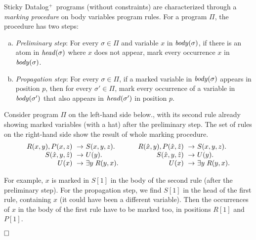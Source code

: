 \documentclass[format=acmsmall, review=false, screen=true]{acmart}
\newcommand{\ignore}[1]{}
\newcommand{\boxtheorem}{\ensuremath{\hfill \Box}}
\newcommand{\prg}{\Pi}
\newcommand{\dplus}{{Datalog}$^+$}
\begin{document}
Sticky \dplus \ programs (without constraints) are characterized through a  {\em marking procedure} on body variables program rules. For a program $\prg$, the procedure has two steps:
\begin{enumerate}[(a)]
  \item {\em Preliminary step}: For every $\sigma \in \prg$ and variable $x$ in ${\it body}(\sigma)$, if there is an atom in ${\it head}(\sigma)$ where $x$ does not appear, mark  every occurrence $x$ in  ${\it body}(\sigma)$.
  \item {\em Propagation step}: For every $\sigma \in \prg$, if a marked variable in ${\it body}(\sigma)$ appears in position $p$, then for every $\sigma' \in \prg$, mark every occurrence of a variable in ${\it body}(\sigma')$ that also appears in ${\it head}(\sigma')$ in  position $p$.
\end{enumerate}

\begin{example} \label{example:stickyNEW}
 Consider program $\Pi$ on the left-hand side below., with its second rule already showing marked variables (with a hat) after the preliminary step. The set of rules on the right-hand side show the result of whole marking procedure.
\[ \arraycolsep=0pt
\begin{array}{rl c rl}
R(x,y),P(x,z) ~\rightarrow&~ S(x,y,z). &\hspace*{1.0cm}& R(\hat{x},y),P(\hat{x},\hat{z}) ~\rightarrow&~ S(x,y,z).\\
S(\hat{x},y,\hat{z}) ~\rightarrow&~ U(y).&\hspace*{1.0cm}&S(\hat{x},y,\hat{z}) ~\rightarrow&~ U(y).\\
U(x) ~\rightarrow&~ \exists y\;R(y,x).&\hspace*{1.0cm}&U(x) ~\rightarrow&~ \exists y\;R(y,x).
\end{array}
\]

 For example, $x$ is marked in $S[1]$ in the body of the second rule (after the preliminary step). For the propagation step, we find $S[1]$ in the head of the first rule, containing $x$ (it could have been a different variable). Then the occurrences of $x$ in the body of the first rule have to be marked too, in positions $R[1]$ and $P[1]$.
\ignore{
 and $z$ in the first rule-body end up marked  after the propagation step: they appear in the same rule's head, in positions where marked variables appear in the second rule ($S[1]$ and $S[3]$).}
 \boxtheorem
\end{example}
\end{document}
